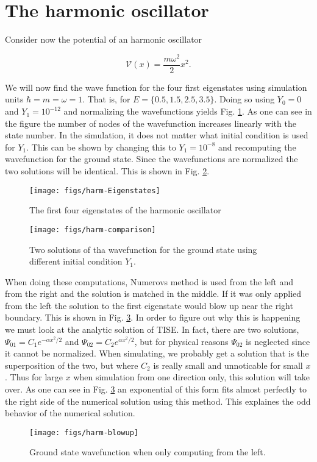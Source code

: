 \section{The harmonic oscillator}

Consider now the potential of an harmonic oscillator

\begin{equation}
  \label{eq:harm}
  \mathcal V(x) = \frac{m \omega^2}{2}x^2.
\end{equation}

We will now find the wave function for the four first eigenstates using simulation units $\hbar = m = \omega = 1$. That is, for $E= \{0.5,1.5,2.5,3.5\}$. Doing so using $Y_0 = 0$ and $Y_1 = 10^{-12}$ and normalizing the wavefunctions yields Fig. \ref{fig:harm-Eigenstates}. As one can see in the figure the number of nodes of the wavefunction increases linearly with the state number. In the simulation, it does not matter what initial condition is used for $Y_1$. This can be shown by changing this to $Y_1 = 10^{-8}$ and recomputing the wavefunction for the ground state. Since the wavefunctions are normalized the two solutions will be identical. This is shown in Fig. \ref{fig:harm-comp}.

\begin{figure}[h]
  \centering
  \texttt{[image: figs/harm-Eigenstates]}
  \caption{The first four eigenstates of the harmonic oscillator}
  \label{fig:harm-Eigenstates}
\end{figure}

\begin{figure}[h]
  \centering
  \texttt{[image: figs/harm-comparison]}
  \caption{Two solutions of tha wavefunction for the ground state using different initial condition $Y_1$.}
  \label{fig:harm-comp}
\end{figure}

When doing these computations, Numerovs method is used from the left and from the right and the solution is matched in the middle. If it was only applied from the left the solution to the first eigenstate would blow up near the right boundary. This is shown in Fig. \ref{fig:harm-blowup}. In order to figure out why this is happening we must look at the analytic solution of TISE. In fact, there are two solutions, $\Psi_{01} = C_1 e^{-\alpha x^2 /2}$ and $\Psi_{02} = C_2 e^{\alpha x^2 /2}$, but for physical reasons $\Psi_{02}$ is neglected since it cannot be normalized. When simulating, we probably get a solution that is the superposition of the two, but where $C_2$ is really small and unnoticable for small $x$. Thus for large $x$ when simulation from one direction only, this solution will take over. As one can see in Fig. \ref{fig:harm-blowup} an exponential of this form fits almost perfectly to the right side of the numerical solution using this method. This explaines the odd behavior of the numerical solution.

\begin{figure}[h]
  \centering
  \texttt{[image: figs/harm-blowup]}
  \caption{Ground state wavefunction when only computing from the left.}
  \label{fig:harm-blowup}
\end{figure}

\clearpage
